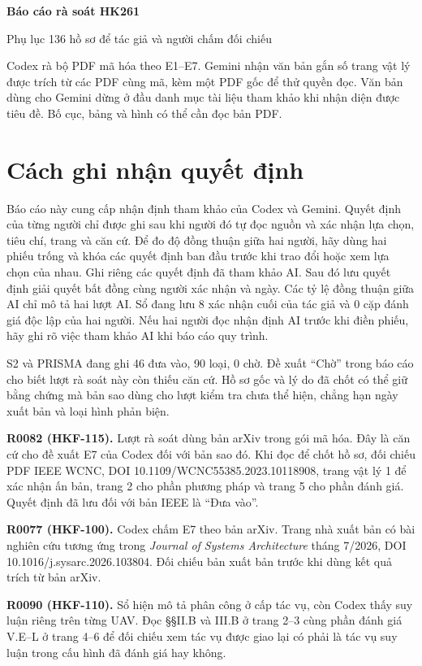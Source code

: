 \documentclass[10pt,a4paper]{article}
\begin{document}
{\LARGE\bfseries Báo cáo rà soát HK261}\par
{\large Phụ lục 136 hồ sơ để tác giả và người chấm đối chiếu}\par


Codex rà bộ PDF mã hóa theo E1--E7. Gemini nhận văn bản gắn số trang vật lý được trích từ các PDF cùng mã, kèm một PDF gốc để thử quyền đọc. Văn bản dùng cho Gemini dừng ở đầu danh mục tài liệu tham khảo khi nhận diện được tiêu đề. Bố cục, bảng và hình có thể cần đọc bản PDF.

\section*{Cách ghi nhận quyết định}
Báo cáo này cung cấp nhận định tham khảo của Codex và Gemini. Quyết định của từng người chỉ được ghi sau khi người đó tự đọc nguồn và xác nhận lựa chọn, tiêu chí, trang và căn cứ. Để đo độ đồng thuận giữa hai người, hãy dùng hai phiếu trống và khóa các quyết định ban đầu trước khi trao đổi hoặc xem lựa chọn của nhau. Ghi riêng các quyết định đã tham khảo AI. Sau đó lưu quyết định giải quyết bất đồng cùng người xác nhận và ngày. Các tỷ lệ đồng thuận giữa AI chỉ mô tả hai lượt AI. Sổ đang lưu 8 xác nhận cuối của tác giả và 0 cặp đánh giá độc lập của hai người. Nếu hai người đọc nhận định AI trước khi điền phiếu, hãy ghi rõ việc tham khảo AI khi báo cáo quy trình.\par
S2 và PRISMA đang ghi 46 đưa vào, 90 loại, 0 chờ. Đề xuất “Chờ” trong báo cáo cho biết lượt rà soát này còn thiếu căn cứ. Hồ sơ gốc và lý do đã chốt có thể giữ bằng chứng mà bản sao dùng cho lượt kiểm tra chưa thể hiện, chẳng hạn ngày xuất bản và loại hình phản biện.

\textbf{R0082 (HKF-115).} Lượt rà soát dùng bản arXiv trong gói mã hóa. Đây là căn cứ cho đề xuất E7 của Codex đối với bản sao đó. Khi đọc để chốt hồ sơ, đối chiếu PDF IEEE WCNC, DOI 10.1109/WCNC55385.2023.10118908, trang vật lý 1 để xác nhận ấn bản, trang 2 cho phần phương pháp và trang 5 cho phần đánh giá. Quyết định đã lưu đối với bản IEEE là “Đưa vào”.

\textbf{R0077 (HKF-100).} Codex chấm E7 theo bản arXiv. Trang nhà xuất bản có bài nghiên cứu tương ứng trong \emph{Journal of Systems Architecture} tháng 7/2026, DOI 10.1016/j.sysarc.2026.103804. Đối chiếu bản xuất bản trước khi dùng kết quả trích từ bản arXiv.

\textbf{R0090 (HKF-110).} Sổ hiện mô tả phân công ở cấp tác vụ, còn Codex thấy suy luận riêng trên từng UAV. Đọc §§II.B và III.B ở trang 2–3 cùng phần đánh giá V.E–L ở trang 4–6 để đối chiếu xem tác vụ được giao lại có phải là tác vụ suy luận trong cấu hình đã đánh giá hay không.
\end{document}
